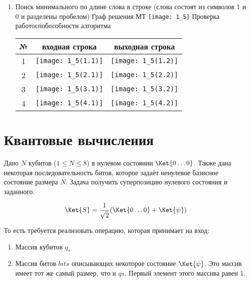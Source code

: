 \documentclass[a4paper, 12pt]{article}
\begin{document}
\begin{enumerate}
  \item Поиск минимального по длине слова в строке (слова состоят из символов 1 и 0 и разделены пробелом) 
   \newline
    Граф решения МТ
    \newline
    \texttt{[image: 1\_5]}
    \newline
    Проверка работоспобособности алгоритма
    \newline
    \begin{tabular}{|*{3}{c|}}
       \hline
       № & входная строка & выходная строка \\
       \hline
       1 & \texttt{[image: 1\_5(1.1)]} & \texttt{[image: 1\_5(1.2)]} \\ 
       \hline
       2 & \texttt{[image: 1\_5(2.1)]} & \texttt{[image: 1\_5(2.2)]} \\ 
       \hline
       3 & \texttt{[image: 1\_5(3.1)]} & \texttt{[image: 1\_5(3.2)]} \\
       \hline
       4 & \texttt{[image: 1\_5(4.1)]} & \texttt{[image: 1\_5(4.2)]} \\
       \hline
    \end{tabular}
\end{enumerate}

\section {Квантовые вычисления}
Дано $N$ кубитов ($1 \le N \le 8$) в нулевом состоянии $\Ket{0\dots0}$. Также дана некоторая последовательность битов, которое задаёт ненулевое базисное состояние размера $N$. Задача получить суперпозицию нулевого состояния и заданного.

$$\Ket{S} = \frac{1}{\sqrt2}(\Ket{0\dots0} +\Ket{\psi})$$

То есть требуется реализовать операцию, которая принимает на вход:

\begin{enumerate}
    \item Массив кубитов $q_s$
    \item Массив битов $bits$ описывающих некоторое состояние $\Ket{\psi}$. Это массив имеет тот же самый размер, что и $qs$. Первый элемент этого массива равен $1$.
\end{enumerate}
\end{document}
